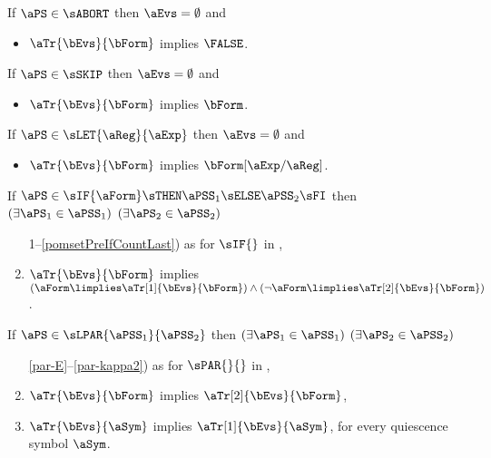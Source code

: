\begin{definition}
  \label{def:pomsets-trans}

  \noindent
  If $\aPS\in\sABORT$ then $\aEvs = \emptyset$ and
  \begin{itemize}
  \item $\aTr{\bEvs}{\bForm}$ implies $\FALSE$.
  \end{itemize}

  \noindent
  If $\aPS\in\sSKIP$ then $\aEvs = \emptyset$ and
  \begin{itemize}
  \item $\aTr{\bEvs}{\bForm}$ implies $\bForm$.
  \end{itemize}

  \noindent
  If $\aPS\in\sLET{\aReg}{\aExp}$ then $\aEvs = \emptyset$ and
  \begin{itemize}
  \item $\aTr{\bEvs}{\bForm}$ implies $\bForm[\aExp/\aReg]$.
  \end{itemize}

  \noindent
  If $\aPS \in \sIF{\aForm}\sTHEN\aPSS_1\sELSE\aPSS_2\sFI$ then
  $(\exists\aPS_1\in\aPSS_1)$ $(\exists\aPS_2\in\aPSS_2)$
  \begin{enumerate}[topsep=0pt]
    \setcounter{enumi}{\value{pomsetPreIfCount}}
  \item[1--\ref{pomsetPreIfCountLast})] as for $\sIF{}$ in ,
  \item \label{if-tau}
    $\aTr{\bEvs}{\bForm}$ implies
    $(\aForm\limplies\aTr[1]{\bEvs}{\bForm})\land(\neg\aForm\limplies\aTr[2]{\bEvs}{\bForm})$.
  \end{enumerate}

  \noindent
  If $\aPS \in \sLPAR{\aPSS_1}{\aPSS_2}$ then
  $(\exists\aPS_1\in\aPSS_1)$ $(\exists\aPS_2\in\aPSS_2)$
  \begin{enumerate}[topsep=0pt]
    \setcounter{enumi}{\value{pomsetPreParCount}}
  \item[\ref{par-E}--\ref{par-kappa2})]
    as for $\sPAR{}{}$ in ,
  \item \label{par-tau1}
    $\aTr{\bEvs}{\bForm}$ implies $\aTr[2]{\bEvs}{\bForm}$,
  \item \label{par-tau2}
    $\aTr{\bEvs}{\aSym}$ implies $\aTr[1]{\bEvs}{\aSym}$,
    for every quiescence symbol $\aSym$.
  \end{enumerate}


\end{definition}
